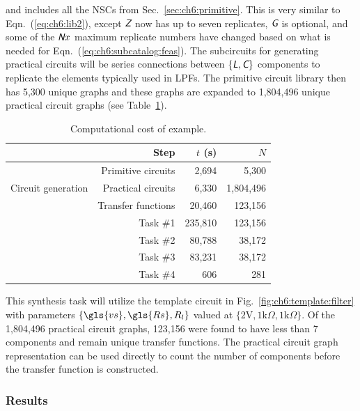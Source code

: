 \noindent and includes all the NSCs from Sec.~\ref{sec:ch6:primitive}.
This is very similar to Eqn.~(\ref{eq:ch6:lib2}), except $\textsl{\textsf{Z}}$ now has up to seven replicates, $\textsl{\textsf{G}}$ is optional, and some of the $\textsl{\textsf{N}}x$ maximum replicate numbers have changed based on what is needed for Eqn.~(\ref{eq:ch6:subcatalog:feas}).
The subcircuits for generating practical circuits will be series connections between $\{\textsl{\textsf{L}},\textsl{\textsf{C}}\}$ components to replicate the elements typically used in LPFs.
The primitive circuit library then has 5,300 unique graphs and these graphs are expanded to 1,804,496 unique practical circuit graphs (see Table~\ref{tb:ch6:lpf:computational}).

\begin{table}[ht]
\centering
\caption{Computational cost of  example.\label{tb:ch6:lpf:computational}}
\begin{tabular}{rrrr}
\hline \hline
 & Step                   & $t$ (s) & $N$ \\
\hline
\multirow{3}{*}{Circuit generation} & Primitive circuits  & 2,694 & 5,300  \\
 & Practical circuits & 6,330  & 1,804,496  \\
 & Transfer functions & 20,460 & 123,156   \\
 \arrayrulecolor{gray}\hline\arrayrulecolor{black}
 \multirow{4}{*}{Evaluation}        & Task \#1 & 235,810 & 123,156     \\
 & Task \#2 & 80,788 &  38,172   \\
 & Task \#3 & 83,231 & 38,172    \\
 & Task \#4 & 606 & 281    \\
\hline \hline
\end{tabular}
\end{table}

This synthesis task will utilize the template circuit in Fig.~\ref{fig:ch6:template:filter} with parameters $\{\gls{vs},\gls{Rs},R_l\}$ valued at $\{2 \text{V}, 1 \text{k}\Omega, 1 \text{k}\Omega\}$.
Of the 1,804,496 practical circuit graphs, 123,156 were found to have less than 7 components and remain unique transfer functions.
The practical circuit graph representation can be used directly to count the number of components before the transfer function is constructed.

\subsubsection{Results}

